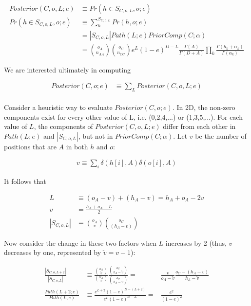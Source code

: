 \documentclass{article}
\begin{document}
\begin{align}
  Posterior(C,o,L;e) & \equiv Pr(h \in S_{C,o,L},o;e) \\
  Pr(h \in S_{C,o,L}, o; e) & \equiv \sum_h^{S_{C,o,L}} Pr(h,o;e) \nonumber \\
  & = |S_{C,o,L}| Path(L;e) PriorComp(C;\alpha) \nonumber \\
  & = {o_A \choose n_{AA}}{o_C \choose n_{CC}}
  e^L(1-e)^{D-L}
  \frac{\Gamma(A)}{\Gamma(D+A)}
  \prod_k \frac{\Gamma(h_k+\alpha_k)}{\Gamma(\alpha_k)}
\end{align}

We are interested ultimately in computing

\begin{align}
  Posterior(C,o;e) & \equiv \sum_L Posterior(C,o,L;e) \nonumber \\
\end{align}




Consider a heuristic way to evaluate $Posterior(C,o;e)$. In 2D, the
non-zero components exist for every other value of L, i.e. (0,2,4,...)
or (1,3,5,...). For each value of $L$, the components of
$Posterior(C,o,L;e)$ differ from each other in $Path(L;e)$ and
$|S_{C,o,L}|$, but not in $PriorComp(C;\alpha)$. Let $v$ be the number
of positions that are $A$ in both $h$ and $o$:

\begin{align*}
  v \equiv \sum_i \delta(h[i],A)\delta(o[i],A)
\end{align*}

It follows that

\begin{align}
  L & \equiv (o_A-v) + (h_A-v) = h_A + o_A - 2v \nonumber \\
  v & = \frac{h_A + o_A - L}{2} \nonumber \\
  |S_{C,o,L}| & \equiv {o_A \choose v}{o_C \choose (h_A-v)} \nonumber
\end{align}

Now consider the change in these two factors when $L$ increases by 2
(thus, $v$ decreases by one, represented by $\check{v} = v - 1$):

\begin{align}
  \frac{|S_{C,o,L+2}|}{|S_{C,o,L}|}
  & \equiv
  \frac{{o_A \choose \check{v}}}{{o_A \choose v}}
  \frac{{o_C \choose h_A-\check{v}}}{{o_C \choose h_A-v}}
  = &
  \frac{v}{o_A-\check{v}}
  \frac{o_C-(h_A-v)}{h_A-\check{v}} \\[4ex]
  \frac{Path(L+2;e)}{Path(L;e)}
  & \equiv
  \frac{e^{L+2}(1-e)^{D-(L+2)}}{e^L(1-e)^{D-L}}
  = &
  \frac{e^2}{(1-e)^2}
\end{align}
\end{document}

